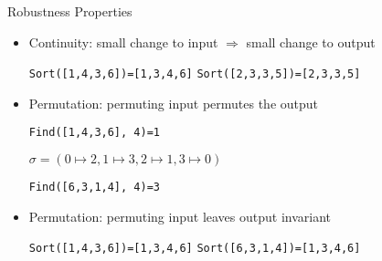 \documentclass[usenames,dvipsnames]{beamer}
\begin{document}
\begin{frame}[fragile]{Robustness Properties}
    \begin{itemize}[<+->]
        \item Continuity: small change to input \(\Rightarrow\) small change to output
        \begin{center}
            \verb!Sort([1,4,3,6])=[1,3,4,6]!
            \verb!Sort([2,3,3,5])=[2,3,3,5]!
        \end{center}
    \item Permutation: permuting input permutes the output
        \begin{center}
            \verb!Find([1,4,3,6], 4)=1!

            \(\sigma = (0\mapsto2, 1\mapsto3, 2\mapsto1, 3\mapsto0)\)%

            \verb!Find([6,3,1,4], 4)=3!
            
        \end{center}
    \item Permutation: permuting input leaves output invariant
        \begin{center}
            \verb!Sort([1,4,3,6])=[1,3,4,6]!
            \verb!Sort([6,3,1,4])=[1,3,4,6]!
        \end{center}
    \end{itemize}
\end{frame}
\end{document}
